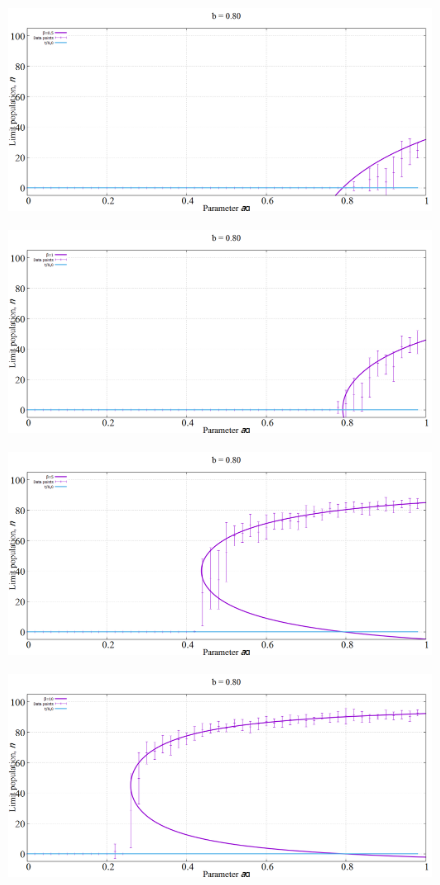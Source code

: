 \begin{figure}[h!]
 \centering
  \includegraphics[width=0.6\linewidth]{images/appendix/simexpt/12.png}
\end{figure}

\begin{figure}[h!]
 \centering
  \includegraphics[width=0.6\linewidth]{images/appendix/simexpt/13.png}
\end{figure}
\newpage
\begin{figure}[h!]
 \centering
  \includegraphics[width=\linewidth]{images/appendix/simexpt/14.png}
\end{figure}

\begin{figure}[h!]
 \centering
  \includegraphics[width=\linewidth]{images/appendix/simexpt/15.png}
\end{figure}

